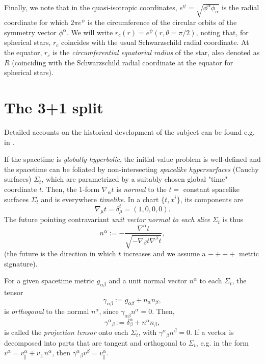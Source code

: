 \documentclass[12pt]{article}
\def\a{\alpha}
\def\b{\beta}
\def\be{\begin{equation}}
\def\ee{\end{equation}}
\newcommand{\na}{\nabla}
\def\a{\alpha}
\def\b{\beta}
\begin{document}
{Finally, we note that in the quasi-isotropic coordinates, 
$e^\psi = \sqrt{\phi^\alpha\phi_\alpha}$ is the radial coordinate for which 
$2\pi e^\psi$ is the circumference of the circular orbits of the symmetry vector 
$\phi^\alpha$. We will write $r_c(r) = e^\psi(r,\theta=\pi/2)$, noting that, 
for spherical stars, $r_c$ coincides with the usual Schwarzschild radial coordinate. 
At the equator, $r_c$ is the {\it circumferential equatorial radius} of the 
star, also denoted as $R$ (coinciding with the Schwarzschild radial coordinate 
at the equator for spherical stars). 

\section{The 3+1 split}
\label{sec:3+1}

 Detailed accounts
on the historical development of the subject can be 
found e.g. in  \cite{Alcubierre2008,Bona2009,Baumgarte2010,Gourgoulhon2012,Shibata1996}. 

 
If the spacetime is \textit{globally hyperbolic}, the initial-value problem is well-defined and the spacetime can be foliated by non-intersecting {\it spacelike hypersurfaces} (Cauchy surfaces) $\Sigma_t$, which are parametrized by a suitably chosen global "time" coordinate $t$. Then, the 1-form $\nabla_\a t$ is  {\it normal} to the 
$t=$ constant spacelike surfaces $\Sigma_t$ and
is everywhere {\it timelike}. In a chart $\{t,x^i\}$, its components are
\be
        \nabla_\mu t = \delta_\mu^t = (1,0,0,0).
\ee
The future pointing contravariant {\it unit vector normal to each slice} $\Sigma_t$ is thus
\be
\boxed{  n^\alpha := - \frac{\nabla^\alpha t}{ \sqrt{-\na_\b t\na^\b t}} 
},
\label{nalpha}
\ee
(the future is the direction in which $t$ increases and we assume a  $-+++$ metric signature). 



For a given spacetime metric $g_{\alpha\beta}$ and a unit normal vector $n^\alpha$ to each $\Sigma_t$, the tensor 
\be
\boxed {
\gamma_{\alpha\beta} :=g_{\alpha\beta} + n_\alpha n_\beta},
\label{gammaab}
\ee
is {\it orthogonal} to the normal $n^\alpha$, since $\gamma_{\alpha\beta}n^\alpha  = 0$. Then, 
\be
 \gamma^\a{}_\b := \delta^\a_\b + n^\a n_\b,
\ee
is called the {\it projection tensor} onto each $\Sigma_t$, with $\gamma^\a{}_\b n^\b = 0$.  If a vector is decomposed into parts that are tangent and orthogonal to $\Sigma_t$, e.g. in the form $  v^\a = v_\parallel^\a + v_\perp n^\a$, then $ \gamma^\a{}_\b v^\b = v_{\parallel}^\a $.

}
\end{document}
